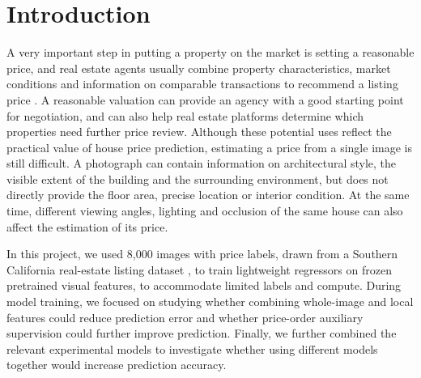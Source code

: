 
\section{Introduction}


A very important step in putting a property on the market is setting a reasonable price, and real estate agents usually combine property characteristics, market conditions and information on comparable transactions to recommend a listing price \cite{nar2026pricing}. A reasonable valuation can provide an agency with a good starting point for negotiation, and can also help real estate platforms determine which properties need further price review. Although these potential uses reflect the practical value of house price prediction, estimating a price from a single image is still difficult. A photograph can contain information on architectural style, the visible extent of the building and the surrounding environment, but does not directly provide the floor area, precise location or interior condition. At the same time, different viewing angles, lighting and occlusion of the same house can also affect the estimation of its price.

In this project, we used 8,000 images with price labels, drawn from a Southern California real-estate listing dataset \cite{dogan2019socal}, to train lightweight regressors on frozen pretrained visual features, to accommodate limited labels and compute. During model training, we focused on studying whether combining whole-image and local features could reduce prediction error and whether price-order auxiliary supervision could further improve prediction. Finally, we further combined the relevant experimental models to investigate whether using different models together would increase prediction accuracy.
